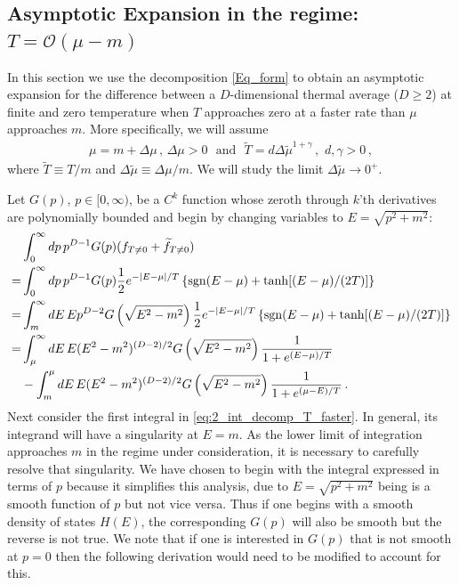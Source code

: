 \documentclass[sn-mathphys,Numbered]{sn-jnl}
\begin{document}
\subsection{Asymptotic Expansion in the regime: $T=\mathcal{O}(\mu-m)$}\label{sec:asymp_T_0_faster}

In this section we use the decomposition \eqref{Eq_form} to obtain an asymptotic expansion for the difference between a $D$-dimensional thermal average ($D\geq 2$) at finite and zero temperature when $T$ approaches zero at a faster rate than $\mu$ approaches $m$.   More specifically, we will assume 
\begin{align}\label{eq:T_mu_relation}
    \mu=m+\Delta\mu\,, \,\Delta\mu>0 \,\, \text{ and } \,\, \widetilde{T}=d\Delta\widetilde{\mu}^{1+\gamma}\,, \,\,d,\gamma>0\,,
\end{align}
where $\widetilde{T}\equiv T/m$ and $\Delta\widetilde{\mu}\equiv \Delta\mu/m$. We will study the limit $\Delta\widetilde{\mu}\to 0^+$.



 Let $G(p)$, $p\in[0,\infty)$, be a $C^k$ function whose zeroth through $k$'th derivatives are polynomially bounded and begin by changing variables to $E=\sqrt{p^2+m^2}$:
\begin{align}
    &\int_0^\infty dp\, p^{D-1} G(p)(f_{T\neq 0}+\widetilde{f}_{T\neq 0})\notag\\
=&\int_0^\infty dp\, p^{D-1} G(p)\frac{1}{2}e^{-|E-\mu|/T}\left\{\mathrm{sgn}(E-\mu)+\tanh[(E-\mu)/(2T)]\right\}\notag\\
    =&\int_m^\infty dE \,Ep^{D-2} G\left(\sqrt{E^2-m^2}\right)\frac{1}{2}e^{-|E-\mu|/T}\left\{\mathrm{sgn}(E-\mu)+\tanh[(E-\mu)/(2T)]\right\}\notag\\
    =&\int_{\mu}^\infty dE\, E(E^2-m^2)^{(D-2)/2} G\left(\sqrt{E^2-m^2}\right)
    \frac{1}{1+e^{(E-\mu)/T}}\label{eq:2_int_decomp_T_faster}  \\
    &-\int_m^{\mu} dE \,E(E^2-m^2)^{(D-2)/2} G\left(\sqrt{E^2-m^2}\right)\frac{1}{1+e^{(\mu-E)/T}} \,.\notag
\end{align}
Next consider the first integral in \eqref{eq:2_int_decomp_T_faster}. In general, its integrand will have a singularity at $E=m$. As the lower limit of integration approaches $m$ in the regime under consideration, it is necessary to carefully resolve that singularity. We have chosen to begin with the integral expressed in terms of $p$ because it simplifies this analysis, due to $E=\sqrt{p^2+m^2}$ being is a smooth function of $p$ but not vice versa. Thus if one begins with a smooth density of states $H(E)$, the corresponding $G(p)$ will also be smooth but the reverse is not true. We note that if one is interested in $G(p)$ that is not smooth at $p=0$ then the following derivation would need to be modified to account for this.
\end{document}
